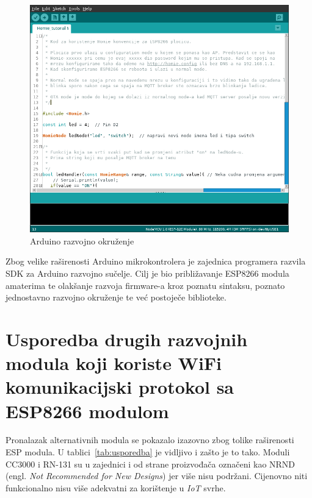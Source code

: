 \documentclass[times, utf8, zavrsni]{fer}
\begin{document}
\begin{figure}[h]
    \centering
    \includegraphics[scale=0.5]{arduino.png}
    \caption{Arduino razvojno okruženje}
\end{figure}

Zbog velike raširenosti Arduino mikrokontrolera je zajednica programera razvila SDK za Arduino razvojno sučelje.
Cilj je bio približavanje ESP8266 modula amaterima te olakšanje razvoja firmware-a kroz poznatu sintaksu, poznato jednostavno razvojno okruženje te već postoječe biblioteke.

\section{Usporedba drugih razvojnih modula koji koriste WiFi komunikacijski protokol sa ESP8266 modulom}
Pronalazak alternativnih modula se pokazalo izazovno zbog tolike raširenosti ESP modula.
U tablici~\ref{tab:usporedba} je vidljivo i zašto je to tako.
Moduli CC3000 i RN-131 su u zajednici i od strane proizvođača označeni kao NRND (engl. \textit{Not Recommended for New Designs}) jer više nisu podržani.
Cijenovno niti funkcionalno nisu više adekvatni za korištenje u \textit{IoT} svrhe.
\end{document}
